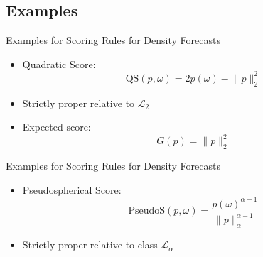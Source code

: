 \documentclass[aspectratio=43,10pt]{beamer}
\begin{document}
\subsection{Examples}
\begin{frame}{Examples for Scoring Rules for Density Forecasts}
\begin{itemize}
    \item Quadratic Score: \begin{equation*}
        \text{QS}(p,\omega)=2p(\omega)-\lVert p\rVert_2^2
    \end{equation*}
    \item Strictly proper relative to $\mathcal L_2$
    \item Expected score: \begin{equation*}
        G(p)=\lVert p\rVert_2^2
    \end{equation*}
\end{itemize}
    
\end{frame}

\begin{frame}{Examples for Scoring Rules for Density Forecasts}
    \begin{itemize}
        \item Pseudospherical Score: \begin{equation*}
            \text{PseudoS}(p,\omega)=\frac{p(\omega)^{\alpha-1}}{\lVert p\rVert_\alpha^{\alpha -1}}
        \end{equation*}
        \item Strictly proper relative to class $\mathcal L_\alpha$
    \end{itemize}
\end{frame}
\end{document}
